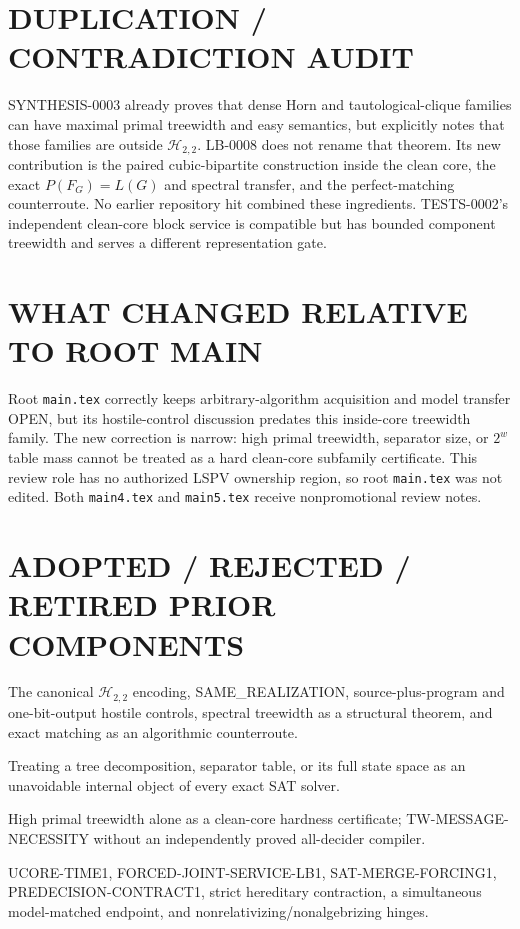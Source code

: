 \documentclass[11pt]{article}
\begin{document}
\section{DUPLICATION / CONTRADICTION AUDIT}
SYNTHESIS-0003 already proves that dense Horn and tautological-clique
families can have maximal primal treewidth and easy semantics, but explicitly
notes that those families are outside \(\mathcal H_{2,2}\).  LB-0008 does
not rename that theorem.  Its new contribution is the paired
cubic-bipartite construction inside the clean core, the exact
\(P(F_G)=L(G)\) and spectral transfer, and the perfect-matching counterroute.
No earlier repository hit combined these ingredients.  TESTS-0002's
independent clean-core block service is compatible but has bounded component
treewidth and serves a different representation gate.

\section{WHAT CHANGED RELATIVE TO ROOT MAIN}
Root \texttt{main.tex} correctly keeps arbitrary-algorithm acquisition and
model transfer OPEN, but its hostile-control discussion predates this
inside-core treewidth family.  The new correction is narrow: high primal
treewidth, separator size, or $2^{w}$ table mass cannot be treated as a hard
clean-core subfamily certificate.  This review role has no authorized LSPV
ownership region, so root \texttt{main.tex} was not edited.  Both
\texttt{main4.tex} and \texttt{main5.tex} receive nonpromotional review notes.

\section{ADOPTED / REJECTED / RETIRED PRIOR COMPONENTS}
\begin{description}[leftmargin=2.9cm,style=nextline]
\item[ADOPTED.] The canonical \(\mathcal H_{2,2}\) encoding, SAME\_REALIZATION,
source-plus-program and one-bit-output hostile controls, spectral treewidth as
a structural theorem, and exact matching as an algorithmic counterroute.
\item[REJECTED.] Treating a tree decomposition, separator table, or its full
state space as an unavoidable internal object of every exact SAT solver.
\item[FALSIFIED/RETIRED.] High primal treewidth alone as a clean-core hardness
certificate; \textsf{TW-MESSAGE-NECESSITY} without an independently proved
all-decider compiler.
\item[OPEN.] UCORE-TIME1, FORCED-JOINT-SERVICE-LB1, SAT-MERGE-FORCING1,
PREDECISION-CONTRACT1, strict hereditary contraction, a simultaneous
model-matched endpoint, and nonrelativizing/nonalgebrizing hinges.
\end{description}
\end{document}
